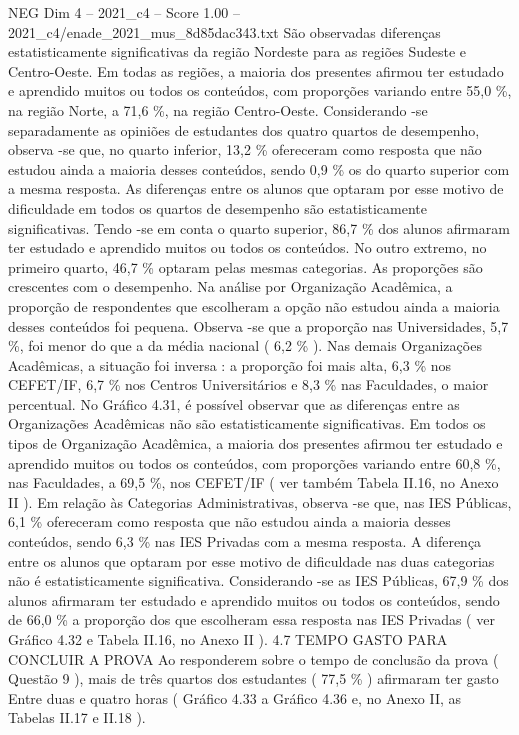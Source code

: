 \begin{textsample}{NEG Dim 4 – 2021\_c4 – Score 1.00 – 2021\_c4/enade\_2021\_mus\_8d85dac343.txt}
São observadas diferenças estatisticamente significativas da região Nordeste para as regiões Sudeste e Centro-Oeste.
Em todas as regiões, a maioria dos presentes afirmou ter estudado e aprendido muitos ou todos os conteúdos, com proporções variando entre 55,0 \%, na região Norte, a 71,6 \%, na região Centro-Oeste.
Considerando -se separadamente as opiniões de estudantes dos quatro quartos de desempenho, observa -se que, no quarto inferior, 13,2 \% ofereceram como resposta que não estudou ainda a maioria desses conteúdos, sendo 0,9 \% os do quarto superior com a mesma resposta.
As diferenças entre os alunos que optaram por esse motivo de dificuldade em todos os quartos de desempenho são estatisticamente significativas.
Tendo -se em conta o quarto superior, 86,7 \% dos alunos afirmaram ter estudado e aprendido muitos ou todos os conteúdos.
No outro extremo, no primeiro quarto, 46,7 \% optaram pelas mesmas categorias.
As proporções são crescentes com o desempenho.
Na análise por Organização Acadêmica, a proporção de respondentes que escolheram a opção não estudou ainda a maioria desses conteúdos foi pequena.
Observa -se que a proporção nas Universidades, 5,7 \%, foi menor do que a da média nacional ( 6,2 \% ).
Nas demais Organizações Acadêmicas, a situação foi inversa : a proporção foi mais alta, 6,3 \% nos CEFET/IF, 6,7 \% nos Centros Universitários e 8,3 \% nas Faculdades, o maior percentual.
No Gráfico 4.31, é possível observar que as diferenças entre as Organizações Acadêmicas não são estatisticamente significativas.
Em todos os tipos de Organização Acadêmica, a maioria dos presentes afirmou ter estudado e aprendido muitos ou todos os conteúdos, com proporções variando entre 60,8 \%, nas Faculdades, a 69,5 \%, nos CEFET/IF ( ver também Tabela II.16, no Anexo II ).
Em relação às Categorias Administrativas, observa -se que, nas IES Públicas, 6,1 \% ofereceram como resposta que não estudou ainda a maioria desses conteúdos, sendo 6,3 \% nas IES Privadas com a mesma resposta.
A diferença entre os alunos que optaram por esse motivo de dificuldade nas duas categorias não é estatisticamente significativa.
Considerando -se as IES Públicas, 67,9 \% dos alunos afirmaram ter estudado e aprendido muitos ou todos os conteúdos, sendo de 66,0 \% a proporção dos que escolheram essa resposta nas IES Privadas ( ver Gráfico 4.32 e Tabela II.16, no Anexo II ). 4.7 TEMPO GASTO PARA CONCLUIR A PROVA Ao responderem sobre o tempo de conclusão da prova ( Questão 9 ), mais de três quartos dos estudantes ( 77,5 \% ) afirmaram ter gasto Entre duas e quatro horas ( Gráfico 4.33 a Gráfico 4.36 e, no Anexo II, as Tabelas II.17 e II.18 ).

\end{textsample}
